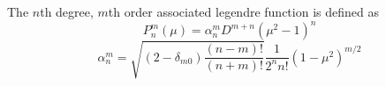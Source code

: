 \documentclass[12pt]{article}
\begin{document}
\begin{equation}
\end{equation}

The $n$th degree, $m$th order associated legendre function is defined as
\begin{equation}
  P_n^m(\mu) = \alpha_n^mD^{m+n}(\mu^2-1)^n
\end{equation}
\begin{equation}
  \alpha_n^m = \sqrt{(2-\delta_{m0})\frac{(n-m)!}{(n+m)!}}\frac{1}{2^nn!}(1-\mu^2)^{m/2}
\end{equation}
\end{document}
